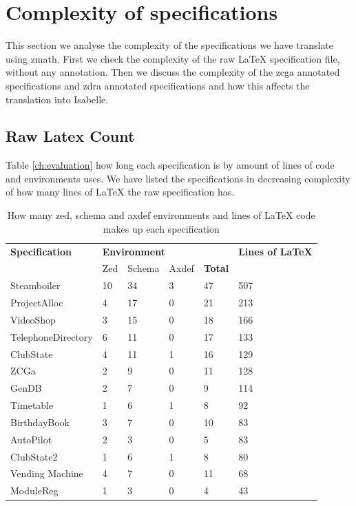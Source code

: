 \section{Complexity of specifications}

This section we analyse the complexity of the specifications we have translate
using \gls{zmath}. First we check the complexity of the raw \LaTeX{}
specification file, without any annotation. Then we discuss the complexity of
the \gls{zcga} annotated specifications and \gls{zdra} annotated specifications
and how this affects the translation into Isabelle.

\subsection{Raw Latex Count}

Table \ref{ch:evaluation} how long each specification is by amount of lines of
code and environments uses. We have listed the specifications in decreasing
complexity of how many lines of \LaTeX{} the raw specification has.

\begin{table}[H]
\centering
\begin{tabular}{|l |l | l |l |l|| l|}
\hline
\textbf{Specification} & \multicolumn{4}{l||}{\textbf{Environment}} &
\textbf{Lines of \LaTeX} \\
\cline{2-5}
& Zed & Schema & Axdef & \textbf{Total} & \\
\hline
Steamboiler & 10 & 34 & 3 & 47 & 507 \\
ProjectAlloc & 4 & 17 & 0 & 21 & 213 \\
VideoShop & 3 & 15 & 0 & 18 & 166 \\
TelephoneDirectory & 6 & 11 & 0 & 17& 133 \\
ClubState & 4 & 11 & 1 & 16 &129 \\
ZCGa & 2 & 9 & 0 & 11 & 128 \\
GenDB & 2 & 7 & 0 & 9 & 114 \\
Timetable & 1 & 6 & 1 & 8 & 92 \\
BirthdayBook & 3 & 7 & 0 & 10 & 83 \\
AutoPilot & 2 & 3 & 0 & 5 & 83 \\
ClubState2 & 1 & 6 & 1 & 8 & 80 \\
Vending Machine & 4 & 7 & 0 & 11 & 68 \\
ModuleReg & 1 & 3 & 0 & 4 & 43 \\
\hline
\end{tabular}
\caption{How many zed, schema and axdef environments and lines of \LaTeX{} code makes up each specification \label{tab:numbersspec}}
\end{table}

